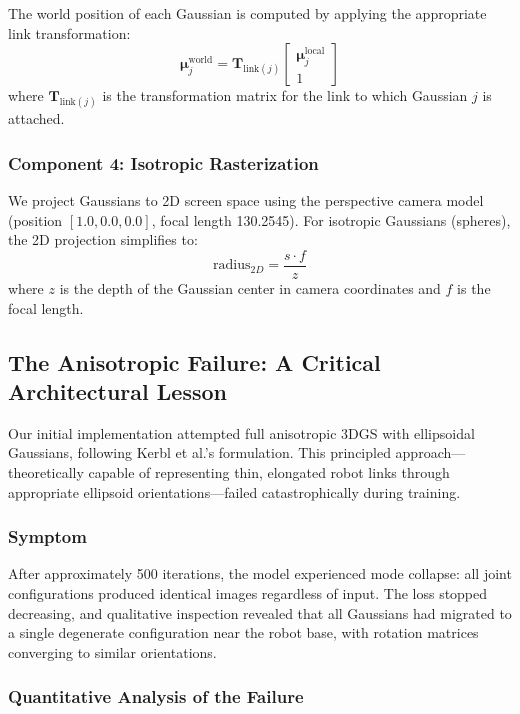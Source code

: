 \documentclass[12pt,a4paper,oneside]{report}
\begin{document}
The world position of each Gaussian is computed by applying the appropriate link transformation:
\begin{equation}
\boldsymbol{\mu}_j^{\text{world}} = \mathbf{T}_{\text{link}(j)} \begin{bmatrix} \boldsymbol{\mu}_j^{\text{local}} \\ 1 \end{bmatrix}
\end{equation}
where $\mathbf{T}_{\text{link}(j)}$ is the transformation matrix for the link to which Gaussian $j$ is attached.

\subsubsection{Component 4: Isotropic Rasterization}

We project Gaussians to 2D screen space using the perspective camera model (position $[1.0, 0.0, 0.0]$, focal length 130.2545). For isotropic Gaussians (spheres), the 2D projection simplifies to:
\begin{equation}
\text{radius}_{2D} = \frac{s \cdot f}{z}
\end{equation}
where $z$ is the depth of the Gaussian center in camera coordinates and $f$ is the focal length.

\subsection{The Anisotropic Failure: A Critical Architectural Lesson}

Our initial implementation attempted full anisotropic 3DGS with ellipsoidal Gaussians, following Kerbl et al.'s formulation. This principled approach---theoretically capable of representing thin, elongated robot links through appropriate ellipsoid orientations---failed catastrophically during training.

\subsubsection{Symptom}

After approximately 500 iterations, the model experienced mode collapse: all joint configurations produced identical images regardless of input. The loss stopped decreasing, and qualitative inspection revealed that all Gaussians had migrated to a single degenerate configuration near the robot base, with rotation matrices converging to similar orientations.

\subsubsection{Quantitative Analysis of the Failure}
\end{document}
